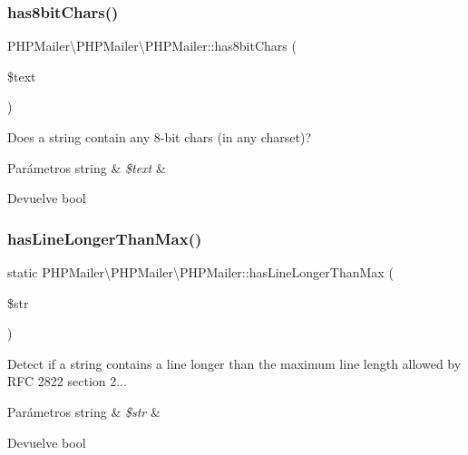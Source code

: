 \subsubsection{\texorpdfstring{has8bit\+Chars()}{has8bitChars()}}
{\footnotesize\ttfamily P\+H\+P\+Mailer\textbackslash{}\+P\+H\+P\+Mailer\textbackslash{}\+P\+H\+P\+Mailer\+::has8bit\+Chars (\begin{DoxyParamCaption}\item[{}]{\$text }\end{DoxyParamCaption})}

Does a string contain any 8-\/bit chars (in any charset)?


\begin{DoxyParams}[1]{Parámetros}
string & {\em \$text} & \\
\hline
\end{DoxyParams}
\begin{DoxyReturn}{Devuelve}
bool 
\end{DoxyReturn}
\mbox{\label{classPHPMailer_1_1PHPMailer_1_1PHPMailer_af817d5f3c045cebb0385ca1a41020ff9}} 
\subsubsection{\texorpdfstring{has\+Line\+Longer\+Than\+Max()}{hasLineLongerThanMax()}}
{\footnotesize\ttfamily static P\+H\+P\+Mailer\textbackslash{}\+P\+H\+P\+Mailer\textbackslash{}\+P\+H\+P\+Mailer\+::has\+Line\+Longer\+Than\+Max (\begin{DoxyParamCaption}\item[{}]{\$str }\end{DoxyParamCaption})\hspace{0.3cm}{\ttfamily [static]}}

Detect if a string contains a line longer than the maximum line length allowed by R\+FC 2822 section 2...


\begin{DoxyParams}[1]{Parámetros}
string & {\em \$str} & \\
\hline
\end{DoxyParams}
\begin{DoxyReturn}{Devuelve}
bool 
\end{DoxyReturn}
\mbox{\label{classPHPMailer_1_1PHPMailer_1_1PHPMailer_a2ca3a330020bf44d4e4df096a2f66be2}} 
